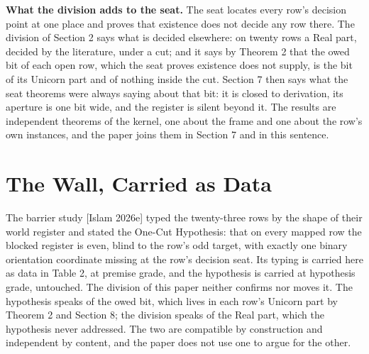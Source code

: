 \documentclass[10pt]{article}
\begin{document}
\textbf{What the division adds to the seat.} The seat locates every
row's decision point at one place and proves that existence does not
decide any row there. The division of Section 2 says what is decided
elsewhere: on twenty rows a Real part, decided by the literature, under
a cut; and it says by Theorem 2 that the owed bit of each open row,
which the seat proves existence does not supply, is the bit of its
Unicorn part and of nothing inside the cut. Section 7 then says what the
seat theorems were always saying about that bit: it is closed to
derivation, its aperture is one bit wide, and the register is silent
beyond it. The results are independent theorems of the kernel, one about
the frame and one about the row's own instances, and the paper joins
them in Section 7 and in this sentence.

\hypertarget{the-wall-carried-as-data}{%
\section{The Wall, Carried as Data}\label{the-wall-carried-as-data}}

The barrier study {[}Islam 2026e{]} typed the twenty-three rows by the
shape of their world register and stated the One-Cut Hypothesis: that on
every mapped row the blocked register is even, blind to the row's odd
target, with exactly one binary orientation coordinate missing at the
row's decision seat. Its typing is carried here as data in Table 2, at
premise grade, and the hypothesis is carried at hypothesis grade,
untouched. The division of this paper neither confirms nor moves it. The
hypothesis speaks of the owed bit, which lives in each row's Unicorn
part by Theorem 2 and Section 8; the division speaks of the Real part,
which the hypothesis never addressed. The two are compatible by
construction and independent by content, and the paper does not use one
to argue for the other.
\end{document}
